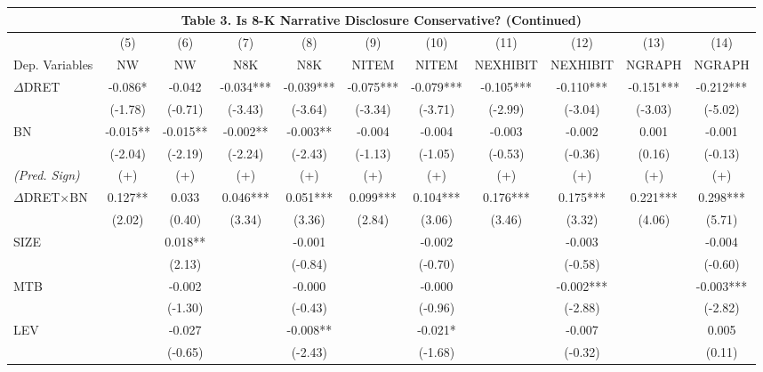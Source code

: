 \begin{table}[H]
	\begin{center}
		\tabcolsep=0.11cm
		\begin{tabular}{lcccccccccc}
			\multicolumn{11}{c}{\textbf{Table 3. Is 8-K Narrative Disclosure Conservative? (Continued)}} \\
			\toprule
			\toprule
			 & (5) & (6) & (7) & (8) & (9) & (10) & (11) & (12) & (13) & (14) \\
			Dep. Variables & NW & NW & N8K & N8K & NITEM & NITEM & NEXHIBIT & NEXHIBIT & NGRAPH & NGRAPH \\
			\midrule
			$\Delta$DRET & -0.086* & -0.042 & -0.034*** & -0.039*** & -0.075*** & -0.079*** & -0.105*** & -0.110*** & -0.151*** & -0.212*** \\
			 & (-1.78) & (-0.71) & (-3.43) & (-3.64) & (-3.34) & (-3.71) & (-2.99) & (-3.04) & (-3.03) & (-5.02) \\
			BN & -0.015** & -0.015** & -0.002** & -0.003** & -0.004 & -0.004 & -0.003 & -0.002 & 0.001 & -0.001 \\
			& (-2.04) & (-2.19) & (-2.24) & (-2.43) & (-1.13) & (-1.05) & (-0.53) & (-0.36) & (0.16) & (-0.13) \\
			\rowcolor[rgb]{ .906,  .902,  .902} \textit{(Pred. Sign)} & (+) & (+) & (+) & (+) & (+) & (+) & (+) & (+) & (+) & (+) \\
			\rowcolor[rgb]{ .906,  .902,  .902} $\Delta$DRET$\times$BN & 0.127** & 0.033 & 0.046*** & 0.051*** & 0.099*** & 0.104*** & 0.176*** & 0.175*** & 0.221*** & 0.298*** \\
			\rowcolor[rgb]{ .906,  .902,  .902}   & (2.02) & (0.40) & (3.34) & (3.36) & (2.84) & (3.06) & (3.46) & (3.32) & (4.06) & (5.71) \\
			SIZE &   & 0.018** &   & -0.001 &   & -0.002 &   & -0.003 &   & -0.004 \\
			&   & (2.13) &   & (-0.84) &   & (-0.70) &   & (-0.58) &   & (-0.60) \\
			MTB &   & -0.002 &   & -0.000 &   & -0.000 &   & -0.002*** &   & -0.003*** \\
			&    & (-1.30) &   & (-0.43) &   & (-0.96) &   & (-2.88) &   & (-2.82) \\
			LEV &  & -0.027 &   & -0.008** &   & -0.021* &   & -0.007 &   & 0.005 \\
			&   & (-0.65) &   & (-2.43) &   & (-1.68) &   & (-0.32) &   & (0.11) \\

\end{tabular}
\end{center}
\end{table}
